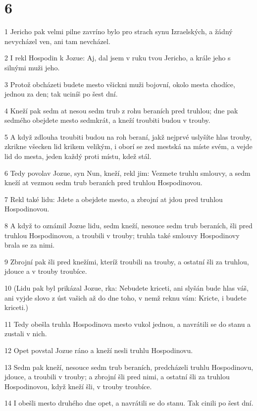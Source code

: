 \chapter{6}

\par 1 Jericho pak velmi pilne zavríno bylo pro strach synu Izraelských, a žádný nevycházel ven, ani tam nevcházel.
\par 2 I rekl Hospodin k Jozue: Aj, dal jsem v ruku tvou Jericho, a krále jeho s silnými muži jeho.
\par 3 Protož obcházeti budete mesto všickni muži bojovní, okolo mesta chodíce, jednou za den; tak uciníš po šest dní.
\par 4 Kneží pak sedm at nesou sedm trub z rohu beraních pred truhlou; dne pak sedmého obejdete mesto sedmkrát, a kneží troubiti budou v trouby.
\par 5 A když zdlouha troubiti budou na roh beraní, jakž nejprvé uslyšíte hlas trouby, zkrikne všecken lid krikem velikým, i oborí se zed mestská na míste svém, a vejde lid do mesta, jeden každý proti místu, kdež stál.
\par 6 Tedy povolav Jozue, syn Nun, kneží, rekl jim: Vezmete truhlu smlouvy, a sedm kneží at vezmou sedm trub beraních pred truhlou Hospodinovou.
\par 7 Rekl také lidu: Jdete a obejdete mesto, a zbrojní at jdou pred truhlou Hospodinovou.
\par 8 A když to oznámil Jozue lidu, sedm kneží, nesouce sedm trub beraních, šli pred truhlou Hospodinovou, a troubili v trouby; truhla také smlouvy Hospodinovy brala se za nimi.
\par 9 Zbrojní pak šli pred knežími, kteríž troubili na trouby, a ostatní šli za truhlou, jdouce a v trouby troubíce.
\par 10 (Lidu pak byl prikázal Jozue, rka: Nebudete kriceti, ani slyšán bude hlas váš, ani vyjde slovo z úst vašich až do dne toho, v nemž reknu vám: Kricte, i budete kriceti.)
\par 11 Tedy obešla truhla Hospodinova mesto vukol jednou, a navrátili se do stanu a zustali v nich.
\par 12 Opet povstal Jozue ráno a kneží nesli truhlu Hospodinovu.
\par 13 Sedm pak kneží, nesouce sedm trub beraních, predcházeli truhlu Hospodinovu, jdouce, a troubili v trouby; a zbrojní šli pred nimi, a ostatní šli za truhlou Hospodinovou, když kneží šli, v trouby troubíce.
\par 14 I obešli mesto druhého dne opet, a navrátili se do stanu. Tak cinili po šest dní.
